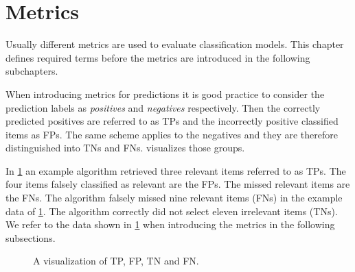 \section{Metrics}
\label{chp:fundamentals:sec:metrics}

Usually different metrics are used to evaluate classification models.
This chapter defines required terms before the metrics are introduced in the following subchapters.

When introducing metrics for predictions it is good practice to consider the prediction labels as \textit{positives} and \textit{negatives} respectively.
Then the correctly predicted positives are referred to as \acp{TP} and the incorrectly positive classified items as \acp{FP}.
The same scheme applies to the negatives and they are therefore distinguished into \acp{TN} and \acp{FN}.
 visualizes those groups. \parencite{Powers:2011}

In \cref{fig:metrics:tp_vis} an example algorithm retrieved three relevant items referred to as \acp{TP}.
The four items falsely classified as relevant are the \acp{FP}.
The missed relevant items are the \acp{FN}.
The algorithm falsely missed nine relevant items (\acp{FN}) in the example data of \cref{fig:metrics:tp_vis}.
The algorithm correctly did not select eleven irrelevant items (\acp{TN}).
We refer to the data shown in \cref{fig:metrics:tp_vis} when introducing the metrics in the following subsections.
\begin{figure}[htpb]
    \centering
    \def\svgwidth{\columnwidth}
    
    \caption[Visualization of True Positives]{A visualization of \ac{TP}, \ac{FP}, \ac{TN} and \ac{FN}.}\label{fig:metrics:tp_vis}
\end{figure}





